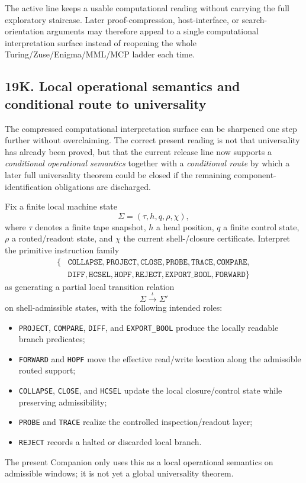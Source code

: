 \begin{corollary}
The active line keeps a usable computational reading without carrying the full exploratory staircase. Later proof-compression, host-interface, or search-orientation arguments may therefore appeal to a single computational interpretation surface instead of reopening the whole Turing/Zuse/Enigma/MML/MCP ladder each time.
\end{corollary}


\subsection*{19K. Local operational semantics and conditional route to universality}
The compressed computational interpretation surface can be sharpened one step further without overclaiming. The correct present reading is not that universality has already been proved, but that the current release line now supports a \emph{conditional operational semantics} together with a \emph{conditional route} by which a later full universality theorem could be closed if the remaining component-identification obligations are discharged.

\begin{definition}
Fix a finite local machine state
\[
\Sigma=(\tau,h,q,\rho,\chi),
\]
where $\tau$ denotes a finite tape snapshot, $h$ a head position, $q$ a finite control state, $\rho$ a routed/readout state, and $\chi$ the current shell-/closure certificate. Interpret the primitive instruction family
\[
\begin{aligned}
\{&\texttt{COLLAPSE},\texttt{PROJECT},\texttt{CLOSE},\texttt{PROBE},\texttt{TRACE},\texttt{COMPARE},\\
&\texttt{DIFF},\texttt{HCSEL},\texttt{HOPF},\texttt{REJECT},\texttt{EXPORT\_BOOL},\texttt{FORWARD}\}
\end{aligned}
\]
as generating a partial local transition relation
\[
\Sigma \xrightarrow{\,\iota\,} \Sigma'
\]
on shell-admissible states, with the following intended roles:
\begin{itemize}[leftmargin=2em]
 \item \texttt{PROJECT}, \texttt{COMPARE}, \texttt{DIFF}, and \texttt{EXPORT\_BOOL} produce the locally readable branch predicates;
 \item \texttt{FORWARD} and \texttt{HOPF} move the effective read/write location along the admissible routed support;
 \item \texttt{COLLAPSE}, \texttt{CLOSE}, and \texttt{HCSEL} update the local closure/control state while preserving admissibility;
 \item \texttt{PROBE} and \texttt{TRACE} realize the controlled inspection/readout layer;
 \item \texttt{REJECT} records a halted or discarded local branch.
\end{itemize}
The present Companion only uses this as a local operational semantics on admissible windows; it is not yet a global universality theorem.
\end{definition}

